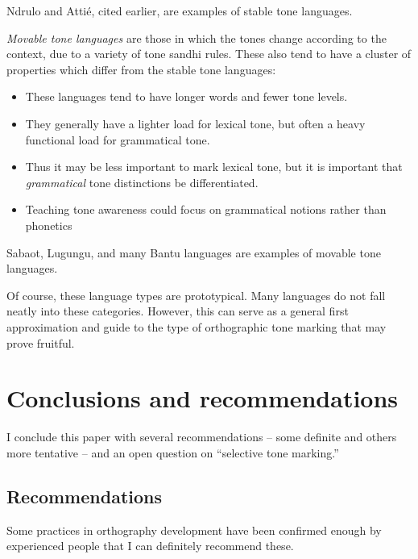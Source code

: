 \documentclass[output=paper]{langscibook}
\begin{document}
Ndrulo and Attié, cited earlier, are examples of stable tone languages. 

\textit{Movable tone languages} are those in which the tones change according to the context, due to a variety of tone sandhi rules. These also tend to have a cluster of properties which differ from the stable tone languages:

\begin{itemize}
    \item These languages tend to have longer words and fewer tone levels. 
    \item They generally have a lighter load for lexical tone, but often a heavy functional load for grammatical tone. 
    \item Thus it may be less important to mark lexical tone, but it is important that \textit{grammatical} tone distinctions be differentiated.
    \item Teaching tone awareness could focus on grammatical notions rather than phonetics 
\end{itemize}

Sabaot, Lugungu, and many Bantu languages are examples of movable tone languages. 

Of course, these language types are prototypical. Many languages do not fall neatly into these categories. However, this can serve as a general first approximation and guide to the type of orthographic tone marking that may prove fruitful.

\section{Conclusions and recommendations}\label{sec:Conclusion:5}

I conclude this paper with several recommendations -- some definite and others more tentative -- and an open question on “selective tone marking.” 

\subsection{Recommendations}
\label{sec:Conclusions:Recommendations:1}
Some practices in orthography development have been confirmed enough by experienced people that I can definitely recommend these.
\end{document}

